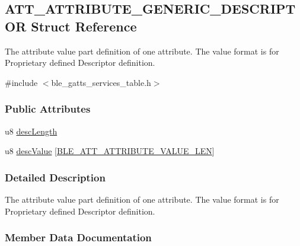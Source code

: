 \hypertarget{struct_a_t_t___a_t_t_r_i_b_u_t_e___g_e_n_e_r_i_c___d_e_s_c_r_i_p_t_o_r}{}\subsection{A\+T\+T\+\_\+\+A\+T\+T\+R\+I\+B\+U\+T\+E\+\_\+\+G\+E\+N\+E\+R\+I\+C\+\_\+\+D\+E\+S\+C\+R\+I\+P\+T\+OR Struct Reference}
\label{struct_a_t_t___a_t_t_r_i_b_u_t_e___g_e_n_e_r_i_c___d_e_s_c_r_i_p_t_o_r}


The attribute value part definition of one attribute. The value format is for Proprietary defined Descriptor definition.  




{\ttfamily \#include $<$ble\+\_\+gatts\+\_\+services\+\_\+table.\+h$>$}

\subsubsection*{Public Attributes}
\begin{DoxyCompactItemize}
\item 
u8 \hyperlink{struct_a_t_t___a_t_t_r_i_b_u_t_e___g_e_n_e_r_i_c___d_e_s_c_r_i_p_t_o_r_a4e869327d516189a47dc16a96ea8cfaa}{desc\+Length}
\item 
u8 \hyperlink{struct_a_t_t___a_t_t_r_i_b_u_t_e___g_e_n_e_r_i_c___d_e_s_c_r_i_p_t_o_r_a1cbfb09ed8e9cac3af4d1e5fe121ecee}{desc\+Value} \mbox{[}\hyperlink{group___b_l_e___g_a_t_t_ga4d1bd224084bd70c854891e4876dcf6f}{B\+L\+E\+\_\+\+A\+T\+T\+\_\+\+A\+T\+T\+R\+I\+B\+U\+T\+E\+\_\+\+V\+A\+L\+U\+E\+\_\+\+L\+EN}\mbox{]}
\end{DoxyCompactItemize}


\subsubsection{Detailed Description}
The attribute value part definition of one attribute. The value format is for Proprietary defined Descriptor definition. 

\subsubsection{Member Data Documentation}
